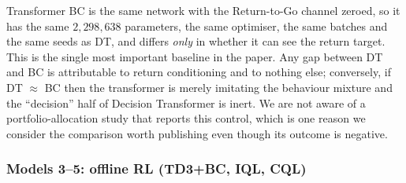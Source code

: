 \documentclass[11pt]{article}
\begin{document}
Transformer BC is the same network with the Return-to-Go channel zeroed, so it has the same
$2{,}298{,}638$ parameters, the same optimiser, the same batches and the same seeds as DT, and
differs \emph{only} in whether it can see the return target. This is the single most important
baseline in the paper. Any gap between DT and BC is attributable to return conditioning and to
nothing else; conversely, if DT $\approx$ BC then the transformer is merely imitating the
behaviour mixture and the ``decision'' half of Decision Transformer is inert. We are not aware
of a portfolio-allocation study that reports this control, which is one reason we consider the
comparison worth publishing even though its outcome is negative.

\subsubsection{Models 3--5: offline RL (TD3+BC, IQL, CQL)}
\end{document}
